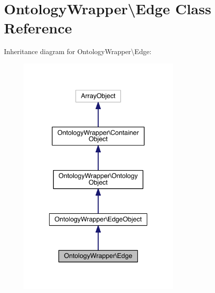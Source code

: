 \hypertarget{class_ontology_wrapper_1_1_edge}{\section{Ontology\-Wrapper\textbackslash{}Edge Class Reference}
\label{class_ontology_wrapper_1_1_edge}
}


Inheritance diagram for Ontology\-Wrapper\textbackslash{}Edge\-:
\nopagebreak
\begin{figure}[H]
\begin{center}
\leavevmode
\includegraphics[width=228pt]{class_ontology_wrapper_1_1_edge__inherit__graph}
\end{center}
\end{figure}


